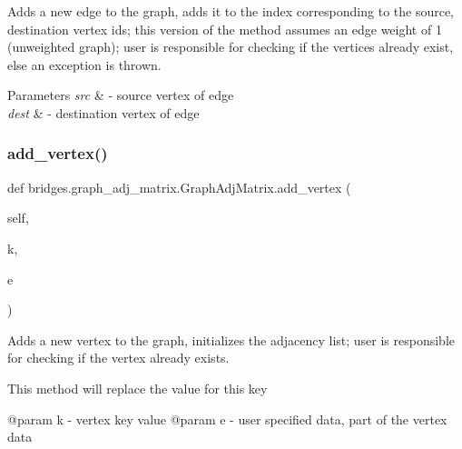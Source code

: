 Adds a new edge to the graph, adds it to the index corresponding to the source, destination vertex ids; this version of the method assumes an edge weight of 1 (unweighted graph); user is responsible for checking if the vertices already exist, else an exception is thrown. 


\begin{DoxyParams}{Parameters}
{\em src} & -\/ source vertex of edge \\
\hline
{\em dest} & -\/ destination vertex of edge \\
\hline
\end{DoxyParams}
\mbox{\label{classbridges_1_1graph__adj__matrix_1_1_graph_adj_matrix_aa6fa31ebae643950dd33628269136d00}} 
\subsubsection{\texorpdfstring{add\+\_\+vertex()}{add\_vertex()}}
{\footnotesize\ttfamily def bridges.\+graph\+\_\+adj\+\_\+matrix.\+Graph\+Adj\+Matrix.\+add\+\_\+vertex (\begin{DoxyParamCaption}\item[{}]{self,  }\item[{}]{k,  }\item[{}]{e }\end{DoxyParamCaption})}



Adds a new vertex to the graph, initializes the adjacency list; user is responsible for checking if the vertex already exists. 

This method will replace the value for this key \begin{DoxyVerb}@param k - vertex key value
@param e - user specified data, part of the vertex data\end{DoxyVerb}
 \mbox{\label{classbridges_1_1graph__adj__matrix_1_1_graph_adj_matrix_aa64d4ed1525c6b4959269df0e4090e01}} 
